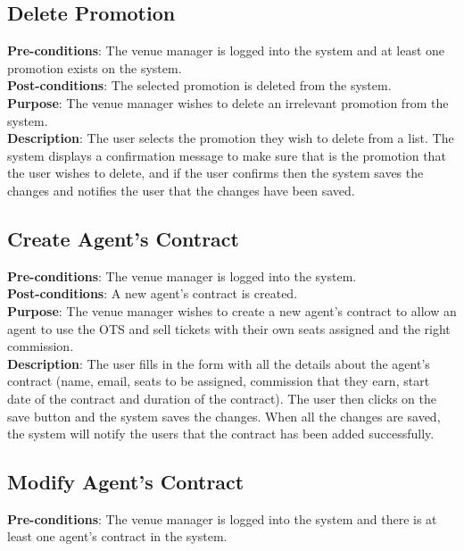 \subsection{Delete Promotion}
\textbf{Pre-conditions}: The venue manager is logged into the system
and at least one promotion exists on the system.\\

\textbf{Post-conditions}: The selected promotion is deleted from the
system.\\

\textbf{Purpose}: The venue manager wishes to delete an irrelevant
promotion from the system.\\

\textbf{Description}: The user selects the promotion they wish to
delete from a list. The system displays a confirmation message
to make sure that is the promotion that the user wishes to delete,
and if the user confirms then the system saves the changes and
notifies the user that the changes have been saved.

\subsection{Create Agent's Contract}
\textbf{Pre-conditions}: The venue manager is logged into the system.\\

\textbf{Post-conditions}: A new agent's contract is created.\\

\textbf{Purpose}: The venue manager wishes to create a new agent's
contract to allow an agent to use the OTS and sell tickets with their own
seats assigned and the right commission.\\

\textbf{Description}: The user fills in the form with all the details
about the agent's contract (name, email, seats to be assigned,
commission that they earn, start date of the contract and duration
of the contract). The user then clicks on the save button and the
system saves the changes. When all the changes are saved, the
system will notify the users that the contract has been added
successfully.

\subsection{Modify Agent's Contract}
\textbf{Pre-conditions}: The venue manager is logged into the system
and there is at least one agent's contract in the system.\\

